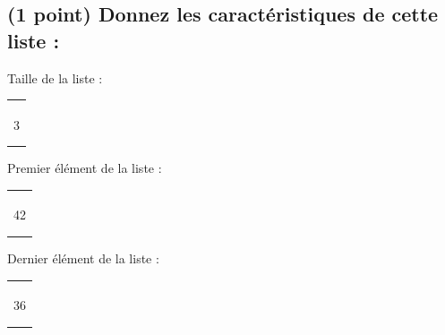 \documentclass[11pt,a4paper]{article}
\begin{document}
\bigskip

\subsection{(1 point) Donnez les caractéristiques de cette liste : }

\bigskip

\begin{table}[h!]
  \centering
  \begin{minipage}{0.3\textwidth}
    \centering
Taille de la liste :

\medskip

\begin{tabular}{ | m{2.5cm} | }
\hline
 \\ \\ \\
3
 \\ \\ \\
\hline
\end{tabular}

  \end{minipage}
  \hfillx
  \begin{minipage}{0.3\textwidth}
    \centering
Premier élément de la liste :

\medskip

\begin{tabular}{ | m{2.5cm} | }
\hline
 \\ \\ \\
42
 \\ \\ \\
\hline
\end{tabular}

  \end{minipage}
  \hfillx
  \begin{minipage}{0.3\textwidth}
    \centering
Dernier élément de la liste :

\medskip

\begin{tabular}{ | m{2.5cm} | }
\hline
 \\ \\ \\
36
 \\ \\ \\
\hline
\end{tabular}

  \end{minipage}
\end{table}
\end{document}
